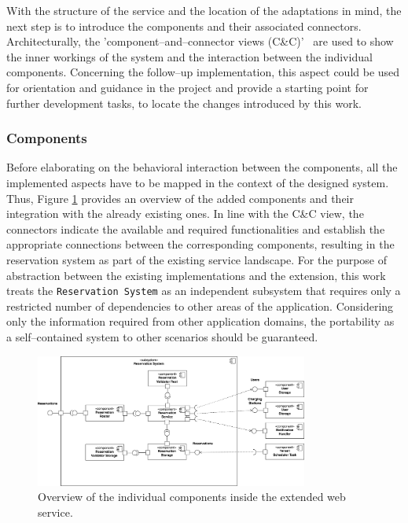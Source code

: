 \noindent With the structure of the service and the location of the adaptations in mind, the next step is to introduce the components and their associated connectors. 
Architecturally, the 'component--and--connector views (C\&C)'~\cite[p.~136]{clements_documenting_2011} are used to show the inner workings of the system and the interaction between the individual components. 
Concerning the follow--up implementation, this aspect could be used for orientation and guidance in the project and provide a starting point for further development tasks, to locate the changes introduced by this work.

\subsubsection{Components}
\label{ch:Implementation:sec:Reservation System:ssec:Architectural Views:sssec:Components}

Before elaborating on the behavioral interaction between the components, all the implemented aspects have to be mapped in the context of the designed system. Thus, Figure \ref{fig:component-view} provides an overview of the added components and their integration with the already existing ones.
In line with the C\&C view, the connectors indicate the available and required functionalities and establish the appropriate connections between the corresponding components, resulting in the reservation system as part of the existing service landscape.
For the purpose of abstraction between the existing implementations and the extension, this work treats the \texttt{Reservation System} as an independent subsystem that requires only a restricted number of dependencies to other areas of the application.
Considering only the information required from other application domains, the portability as a self--contained system to other scenarios should be guaranteed.

\begin{figure}[h]
    \centering
    \includegraphics[width=0.8\textwidth,keepaspectratio]{resources/images/main/6_implementation/ReservationComponents.png}
    \caption{Overview of the individual components inside the extended web service.}
    \label{fig:component-view}
\end{figure}

